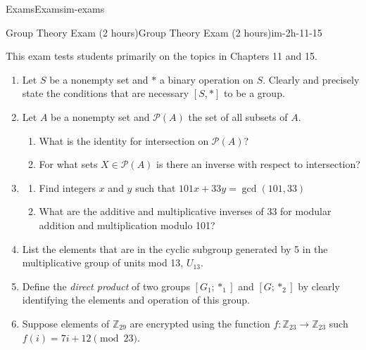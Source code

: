 \documentclass[oneside,10pt,]{book}
\begin{document}
\begin{chapterptx}{Exams}{}{Exams}{}{}{im-exams}
%
\begin{sectionptx}{Group Theory Exam (2 hours)}{}{Group Theory Exam (2 hours)}{}{}{im-2h-11-15}
\begin{introduction}{}%
\hypertarget{p-56}{}%
This exam tests students primarily on the topics in Chapters 11 and 15.%
\end{introduction}%
\hypertarget{p-57}{}%
\leavevmode%
\begin{enumerate}
\item\hypertarget{li-31}{}\hypertarget{p-58}{}%
Let \(S\) be a nonempty set and \(*\) a binary operation on \(S\). Clearly and precisely state the conditions that are necessary \([S,*]\) to be a group.%
\item\hypertarget{li-32}{}\hypertarget{p-59}{}%
Let \(A\) be a nonempty set and \(\mathcal{P}(A)\) the set of all subsets of \(A\).%
\begin{enumerate}
\item\hypertarget{li-33}{}\hypertarget{p-60}{}%
What is the identity for intersection on \(\mathcal{P}(A)\)?%
\item\hypertarget{li-34}{}\hypertarget{p-61}{}%
For what sets \(X \in \mathcal{P}(A)\) is there an inverse with respect to intersection?%
\end{enumerate}
%
\item\hypertarget{li-35}{}\hypertarget{p-62}{}%
%
\begin{enumerate}
\item\hypertarget{li-36}{}\hypertarget{p-63}{}%
Find integers \(x\) and \(y\) such that \(101x + 33 y = \gcd (101,33)\)%
\item\hypertarget{li-37}{}\hypertarget{p-64}{}%
What are the additive and multiplicative inverses of 33 for modular addition and multiplication modulo 101?%
\end{enumerate}
%
\item\hypertarget{li-38}{}\hypertarget{p-65}{}%
List the elements that are in the cyclic subgroup generated by 5 in the multiplicative group of units mod 13, \(U_{13}\).%
\item\hypertarget{li-39}{}\hypertarget{p-66}{}%
Define the \emph{direct product} of two groups \(\left[G_1; *_1\right]\) and \(\left[G; *_2\right]\) by clearly identifying the elements and operation of this group.%
\item\hypertarget{li-40}{}\hypertarget{p-67}{}%
Suppose elements of \(\mathbb{Z}_{29}\) are encrypted using the function \(f:\mathbb{Z}_{23}\to \mathbb{Z}_{23}\) such \(f(i)=7i +12 \pmod{23}\).%
\begin{enumerate}

\end{enumerate}
\end{enumerate}
\end{sectionptx}
\end{chapterptx}
\end{document}
